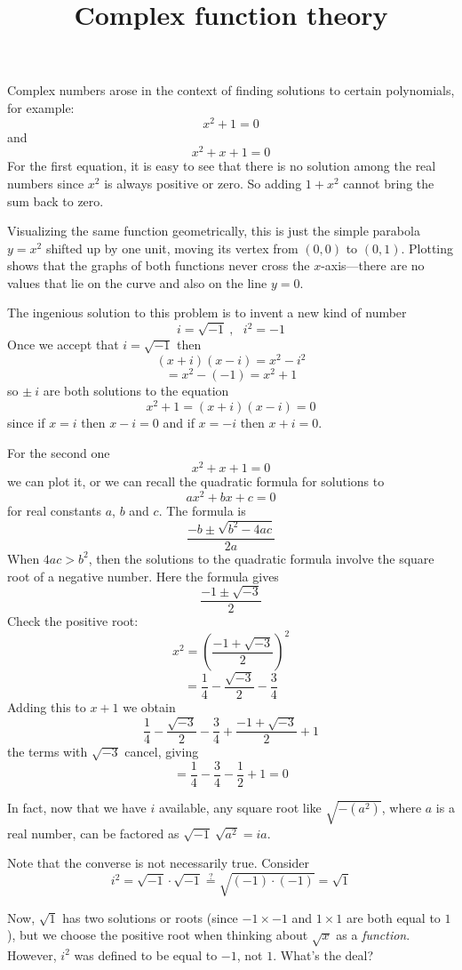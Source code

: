 \documentclass[11pt, oneside]{article}   	%
\title{Complex function theory}
\date{}							%
\begin{document}
\maketitle
\Large

Complex numbers arose in the context of finding solutions to certain polynomials, for example:
\[ x^2 + 1 = 0 \]
and
\[ x^2 + x + 1 = 0 \]
For the first equation, it is easy to see that there is no solution among the real numbers since $x^2$ is always positive or zero.  So adding $1 + x^2$ cannot bring the sum back to zero.

Visualizing the same function geometrically, this is just the simple parabola $y=x^2$ shifted up by one unit, moving its vertex from $(0,0)$ to $(0,1)$.  Plotting shows that the graphs of both functions never cross the $x$-axis---there are no values that lie on the curve and also on the line $y=0$.

The ingenious solution to this problem is to invent a new kind of number
\[ i = \sqrt{-1} \ , \ \ \ i^2 = -1 \]
Once we accept that $i = \sqrt{-1}$
then
\[ (x + i)(x - i) = x^2 - i^2 \]
\[ = x^2 - (-1) = x^2 + 1 \]
so $\pm \ i$ are both solutions to the equation 
\[ x^2 + 1 = (x + i)(x - i) = 0 \]
since if $x = i$ then $x - i = 0$ and if $x = -i$ then $x + i = 0$.

For the second one
\[ x^2 + x + 1 = 0 \]
we can plot it, or we can recall the quadratic formula for solutions to
\[ ax^2 + bx + c = 0 \]
for real constants $a$, $b$ and $c$.  The formula is
\[ \frac{-b \pm \sqrt{b^2 - 4ac}}{2a} \]
When $4ac > b^2$, then the solutions to the quadratic formula involve the square root of a negative number.  Here the formula gives
\[ \frac{-1 \pm \sqrt{-3}}{2} \]
Check the positive root:
\[ x^2 = (\frac{-1 + \sqrt{-3}}{2})^2 \]
\[ = \frac{1}{4} - \frac{\sqrt{-3}}{2} - \frac{3}{4} \]
Adding this to $x+1$ we obtain
\[  \frac{1}{4} - \frac{\sqrt{-3}}{2} - \frac{3}{4}  + \frac{-1 + \sqrt{-3}}{2} + 1 \]
the terms with $\sqrt{-3}$ cancel, giving
\[ = \frac{1}{4} - \frac{3}{4}  - \frac{1}{2} + 1 = 0 \]

In fact, now that we have $i$ available, any square root like $\sqrt{-(a^2)}$, where $a$ is a real number, can be factored as $\sqrt{-1} \ \sqrt{a^2} = ia$.

Note that the converse is not necessarily true.  Consider
\[ i^2 = \sqrt{-1} \cdot \sqrt{-1} \stackrel{?}{=} \sqrt{(-1)\cdot (-1)} = \sqrt{1} \]

Now, $\sqrt{1}$ has two solutions or roots (since $-1 \times -1$ and $1 \times 1$ are both equal to $1$), but we choose the positive root when thinking about $\sqrt{x}$ as a \emph{function}.  However, $i^2$ was defined to be equal to $-1$, not $1$.  What's the deal?
\end{document}
